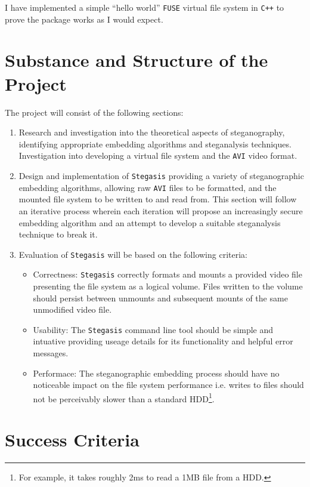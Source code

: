 \documentclass[paper=a4, fontsize=11pt,twoside]{scrartcl}
\numberwithin{table}{section}
\numberwithin{figure}{section}
\numberwithin{algorithm}{section}
\begin{document}
I have implemented a simple ``hello world'' \texttt{FUSE} virtual file system in \texttt{C++} to prove the package works as I would expect.

\section*{Substance and Structure of the Project}
The project will consist of the following sections:
\begin{enumerate}
\item Research and investigation into the theoretical aspects of steganography, identifying appropriate embedding algorithms and steganalysis techniques. Investigation into developing a virtual file system and the \texttt{AVI} video format.
\item Design and implementation of \texttt{Stegasis} providing a variety of steganographic embedding algorithms, allowing raw \texttt{AVI} files to be formatted, and the mounted file system to be written to and read from. This section will follow an iterative process wherein each iteration will propose an increasingly secure embedding algorithm and an attempt to develop a suitable steganalysis technique to break it.
\item Evaluation of \texttt{Stegasis} will be based on the following criteria:
    \begin{itemize}
    \item Correctness: \texttt{Stegasis} correctly formats and mounts a provided video file presenting the file system as a logical volume. Files written to the volume should persist between unmounts and subsequent mounts of the same unmodified video file.
    \item Usability: The \texttt{Stegasis} command line tool should be simple and intuative providing useage details for its functionality and helpful error messages.
    \item Performace: The steganographic embedding process should have no noticeable impact on the file system performance i.e. writes to files should not be perceivably slower than a standard HDD\footnote{For example, it takes roughly 2ms to read a 1MB file from a HDD.}.
    \end{itemize}
\end{enumerate}

\section*{Success Criteria}
\end{document}
